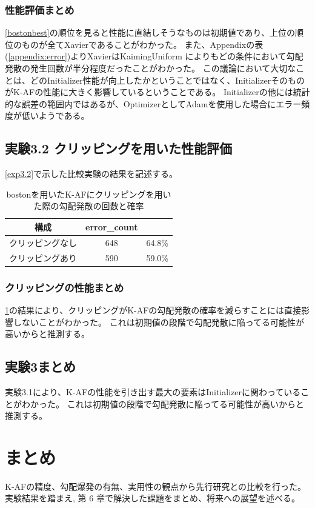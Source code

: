 \subsubsection{性能評価まとめ}
\ref{bostonbest}の順位を見ると性能に直結しそうなものは初期値であり、上位の順位のものが全てXavierであることがわかった。
また、Appendixの表(\ref{appendix:error})よりXavierはKaimingUniform によりもどの条件において勾配発散の発生回数が半分程度だったことがわかった。
この議論において大切なことは、どのInitializer性能が向上したかということではなく、InitializerそのものがK-AFの性能に大きく影響しているということである。
Initializerの他には統計的な誤差の範囲内ではあるが、OptimizerとしてAdamを使用した場合にエラー頻度が低いようである。

\subsection{実験3.2 クリッピングを用いた性能評価}
\label{evo3.2}
\ref{exp3.2}で示した比較実験の結果を記述する。


\begin{table}[htbp]
    \begin{center}
        \caption{bostonを用いたK-AFにクリッピングを用いた際の勾配発散の回数と確率}
        \label{clipping_boston}
        \vspace{2mm} 
        \begin{tabular}{ |c|c|c| }
        構成 & error\_count & \\
        \hline
        クリッピングなし  & 648 & 64.8\% \\
        \hline
        クリッピングあり  & 590 & 59.0\% \\
        \end{tabular}
    \end{center}
\end{table}



\subsubsection{クリッピングの性能まとめ}
\ref{clipping_boston}の結果により、クリッピングがK-AFの勾配発散の確率を減らすことには直接影響しないことがわかった。
これは初期値の段階で勾配発散に陥ってる可能性が高いからと推測する。



\subsection{実験3まとめ}
実験3.1により、K-AFの性能を引き出す最大の要素はInitializerに関わっていることがわかった。
これは初期値の段階で勾配発散に陥ってる可能性が高いからと推測する。



\section{まとめ}

K-AFの精度、勾配爆発の有無、実用性の観点から先行研究との比較を行った。
実験結果を踏まえ, 第 6 章で解決した課題をまとめ、将来への展望を述べる。


